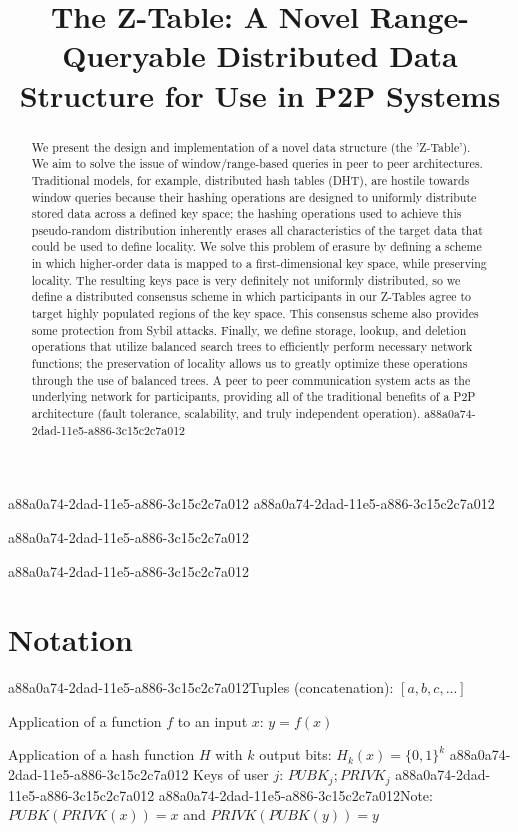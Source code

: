 \documentclass[12pt]{article}
\title{The Z-Table: A Novel Range-Queryable Distributed Data Structure for Use in P2P Systems}
\begin{document}
a88a0a74-2dad-11e5-a886-3c15c2c7a012
a88a0a74-2dad-11e5-a886-3c15c2c7a012\maketitle

a88a0a74-2dad-11e5-a886-3c15c2c7a012\begin{abstract}
We present the design and implementation of a novel data structure (the 'Z-Table'). We aim to solve the issue of window/range-based queries in peer to peer architectures. Traditional models, for example,  distributed hash tables (DHT), are hostile towards window queries because their hashing operations are designed to uniformly distribute stored data across a defined key space; the hashing operations used to achieve this pseudo-random distribution inherently erases all characteristics of the target data that could be used to define locality. We solve this problem of erasure by defining a scheme in which higher-order data is mapped to a first-dimensional key space, while preserving locality. The resulting keys pace is very definitely not uniformly distributed, so we define a distributed consensus scheme in which participants in our Z-Tables agree to target highly populated regions of the key space. This consensus scheme also provides some protection from Sybil attacks. Finally, we define storage, lookup, and deletion operations that utilize balanced search trees to efficiently perform necessary network functions; the preservation of locality allows us to greatly optimize these operations through the use of balanced trees. A peer to peer communication system acts as the underlying network for participants, providing all of the traditional benefits of a P2P architecture (fault tolerance, scalability, and truly independent operation).
a88a0a74-2dad-11e5-a886-3c15c2c7a012\end{abstract}
a88a0a74-2dad-11e5-a886-3c15c2c7a012
\section{Notation}

a88a0a74-2dad-11e5-a886-3c15c2c7a012Tuples (concatenation): $[a,b,c,...]$

Application of a function $f$ to an input $x$: $y=f(x)$

Application of a hash function $H$ with $k$ output bits: $H_{k}(x) = \{0,1\}^k$
a88a0a74-2dad-11e5-a886-3c15c2c7a012
Keys of user $j$: $ PUBK_j; PRIVK_j $
a88a0a74-2dad-11e5-a886-3c15c2c7a012
a88a0a74-2dad-11e5-a886-3c15c2c7a012Note: $PUBK(PRIVK(x)) = x$ and $PRIVK(PUBK(y)) = y$~
\end{document}
